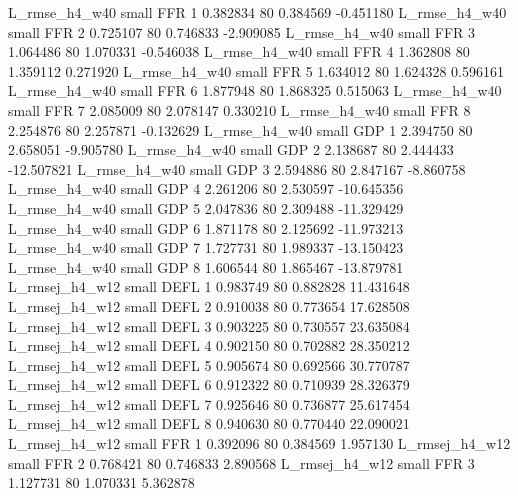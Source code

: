  L_rmse_h4_w40      small      FFR                 1 0.382834 80       0.384569          -0.451180
 L_rmse_h4_w40      small      FFR                 2 0.725107 80       0.746833          -2.909085
 L_rmse_h4_w40      small      FFR                 3 1.064486 80       1.070331          -0.546038
 L_rmse_h4_w40      small      FFR                 4 1.362808 80       1.359112           0.271920
 L_rmse_h4_w40      small      FFR                 5 1.634012 80       1.624328           0.596161
 L_rmse_h4_w40      small      FFR                 6 1.877948 80       1.868325           0.515063
 L_rmse_h4_w40      small      FFR                 7 2.085009 80       2.078147           0.330210
 L_rmse_h4_w40      small      FFR                 8 2.254876 80       2.257871          -0.132629
 L_rmse_h4_w40      small      GDP                 1 2.394750 80       2.658051          -9.905780
 L_rmse_h4_w40      small      GDP                 2 2.138687 80       2.444433         -12.507821
 L_rmse_h4_w40      small      GDP                 3 2.594886 80       2.847167          -8.860758
 L_rmse_h4_w40      small      GDP                 4 2.261206 80       2.530597         -10.645356
 L_rmse_h4_w40      small      GDP                 5 2.047836 80       2.309488         -11.329429
 L_rmse_h4_w40      small      GDP                 6 1.871178 80       2.125692         -11.973213
 L_rmse_h4_w40      small      GDP                 7 1.727731 80       1.989337         -13.150423
 L_rmse_h4_w40      small      GDP                 8 1.606544 80       1.865467         -13.879781
L_rmsej_h4_w12      small     DEFL                 1 0.983749 80       0.882828          11.431648
L_rmsej_h4_w12      small     DEFL                 2 0.910038 80       0.773654          17.628508
L_rmsej_h4_w12      small     DEFL                 3 0.903225 80       0.730557          23.635084
L_rmsej_h4_w12      small     DEFL                 4 0.902150 80       0.702882          28.350212
L_rmsej_h4_w12      small     DEFL                 5 0.905674 80       0.692566          30.770787
L_rmsej_h4_w12      small     DEFL                 6 0.912322 80       0.710939          28.326379
L_rmsej_h4_w12      small     DEFL                 7 0.925646 80       0.736877          25.617454
L_rmsej_h4_w12      small     DEFL                 8 0.940630 80       0.770440          22.090021
L_rmsej_h4_w12      small      FFR                 1 0.392096 80       0.384569           1.957130
L_rmsej_h4_w12      small      FFR                 2 0.768421 80       0.746833           2.890568
L_rmsej_h4_w12      small      FFR                 3 1.127731 80       1.070331           5.362878

